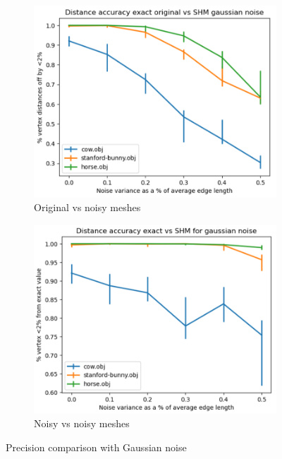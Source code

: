 \documentclass[sigconf]{acmart}
\begin{document}
\begin{figure}[htbp]
  \centering
  \hfill
  \begin{subfigure}[b]{0.23\textwidth}
    \centering
    \includegraphics[width=\textwidth]{original_vs_noisy.png}
    \caption{Original vs noisy meshes}
    \label{fig:original_vs_noisy}
  \end{subfigure}
  \begin{subfigure}[b]{0.23\textwidth}
    \centering
    \includegraphics[width=\textwidth]{noisy_vs_noisy.png}
    \caption{Noisy vs noisy meshes}
    \label{fig:noisy_vs_noisy}
  \end{subfigure}
  \caption{Precision comparison with Gaussian noise}
  \label{fig:original_vs_noisy_gaussian}
  \Description{}
\end{figure}
\end{document}
